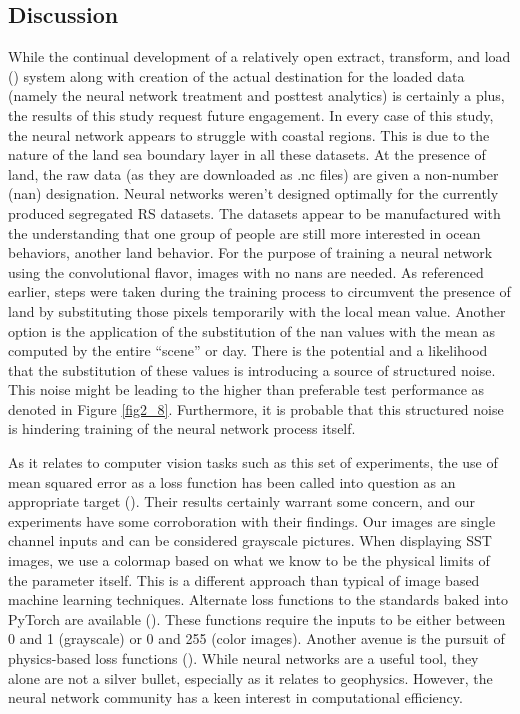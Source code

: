 \begin{refsection}
\subsection{Discussion}
While the continual development of a relatively open extract, transform, and load (\cite{bansal2015integrating}) system along with creation of the actual destination for the loaded data (namely the neural network treatment and posttest analytics) is certainly a plus, the results of this study request future engagement. In every case of this study, the neural network appears to struggle with coastal regions. This is due to the nature of the land sea boundary layer in all these datasets. At the presence of land, the raw data (as they are downloaded as .nc files) are given a non-number (nan) designation. Neural networks weren’t designed optimally for the currently produced segregated RS datasets. The datasets appear to be manufactured with the understanding that one group of people are still more interested in ocean behaviors, another land behavior. For the purpose of training a neural network using the convolutional flavor, images with no nans are needed. As referenced earlier, steps were taken during the training process to circumvent the presence of land by substituting those pixels temporarily with the local mean value. Another option is the application of the substitution of the nan values with the mean as computed by the entire “scene” or day. There is the potential and a likelihood that the substitution of these values is introducing a source of structured noise. This noise might be leading to the higher than preferable test performance as denoted in Figure \ref{fig2_8}. Furthermore, it is probable that this structured noise is hindering training of the neural network process itself. 

As it relates to computer vision tasks such as this set of experiments, the use of mean squared error as a loss function has been called into question as an appropriate target (\cite{wang2009mean}). Their results certainly warrant some concern, and our experiments have some corroboration with their findings. Our images are single channel inputs and can be considered grayscale pictures. When displaying SST images, we use a colormap based on what we know to be the physical limits of the parameter itself. This is a different approach than typical of image based machine learning techniques. Alternate loss functions to the standards baked into PyTorch are available (\cite{kastryulin2022image}). These functions require the inputs to be either between 0 and 1 (grayscale) or 0 and 255 (color images). Another avenue is the pursuit of physics-based loss functions (\cite{psaros2022meta}). While neural networks are a useful tool, they alone are not a silver bullet, especially as it relates to geophysics. However, the neural network community has a keen interest in computational efficiency.


\end{refsection}
